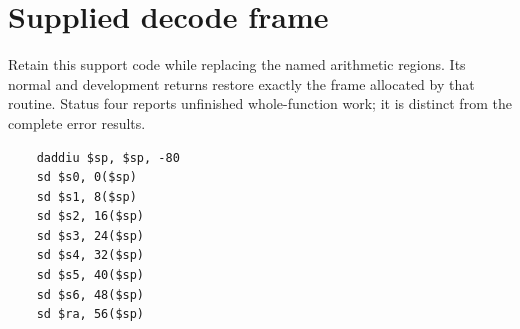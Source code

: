 \section{Supplied decode frame}
Retain this support code while replacing the named arithmetic regions. Its normal and development returns restore exactly the frame allocated by that routine. Status four reports unfinished whole-function work; it is distinct from the complete error results.

\begin{verbatim}
    daddiu $sp, $sp, -80
    sd $s0, 0($sp)
    sd $s1, 8($sp)
    sd $s2, 16($sp)
    sd $s3, 24($sp)
    sd $s4, 32($sp)
    sd $s5, 40($sp)
    sd $s6, 48($sp)
    sd $ra, 56($sp)
\end{verbatim}

